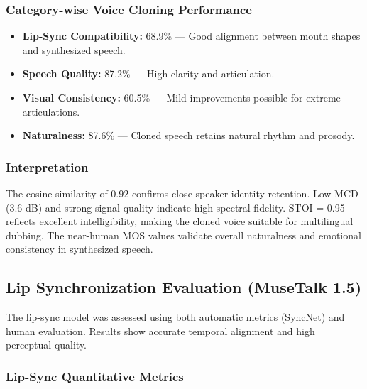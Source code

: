 \documentclass[12pt,oneside]{report}
\begin{document}
\subsubsection*{Category-wise Voice Cloning Performance}
\begin{itemize}
    \item \textbf{Lip-Sync Compatibility:} 68.9\% — Good alignment between mouth shapes and synthesized speech.
    \item \textbf{Speech Quality:} 87.2\% — High clarity and articulation.
    \item \textbf{Visual Consistency:} 60.5\% — Mild improvements possible for extreme articulations.
    \item \textbf{Naturalness:} 87.6\% — Cloned speech retains natural rhythm and prosody.
\end{itemize}

\subsubsection*{Interpretation}

The cosine similarity of 0.92 confirms close speaker identity retention.  
Low MCD (3.6 dB) and strong signal quality indicate high spectral fidelity.  
STOI = 0.95 reflects excellent intelligibility, making the cloned voice suitable for multilingual dubbing.  
The near-human MOS values validate overall naturalness and emotional consistency in synthesized speech.


\subsection{Lip Synchronization Evaluation (MuseTalk 1.5)}

The lip-sync model was assessed using both automatic metrics (SyncNet) and human evaluation. Results show accurate temporal alignment and high perceptual quality.

\subsubsection*{Lip-Sync Quantitative Metrics}
\end{document}
